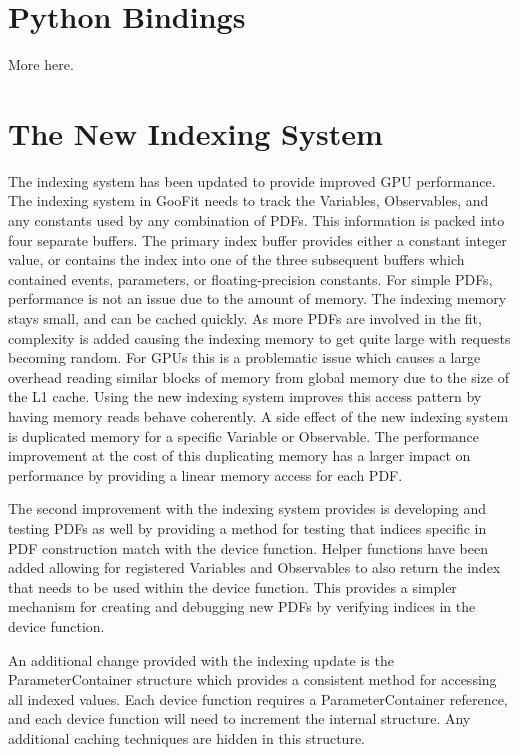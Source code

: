 \documentclass{webofc}
\begin{document}
\section{Python Bindings}
\label{sec-py}
More here.

\section{The New Indexing System}
\label{sec-ind}
The indexing system has been updated to provide improved GPU performance. The indexing system in GooFit needs to track the Variables, Observables, and any constants used by any combination of PDFs. This information is packed into four separate buffers. The primary index buffer provides either a constant integer value, or contains the index into one of the three subsequent buffers which contained events, parameters, or floating-precision constants\cite{GooFit}. For simple PDFs, performance is not an issue due to the amount of memory. The indexing memory stays small, and can be cached quickly. As more PDFs are involved in the fit, complexity is added causing the indexing memory to get quite large with requests becoming random. For GPUs this is a problematic issue which causes a large overhead reading similar blocks of memory from global memory due to the size of the L1 cache. Using the new indexing system improves this access pattern by having memory reads behave coherently. A side effect of the new indexing system is duplicated memory for a specific Variable or Observable. The performance improvement at the cost of this duplicating memory has a larger impact on performance by providing a linear memory access for each PDF.

The second improvement with the indexing system provides is developing and testing PDFs as well by providing a method for testing that indices specific in PDF construction match with the device function. Helper functions have been added allowing for registered Variables and Observables to also return the index that needs to be used within the device function. This provides a simpler mechanism for creating and debugging new PDFs by verifying indices in the device function. 

An additional change provided with the indexing update is the ParameterContainer structure which provides a consistent method for accessing all indexed values. Each device function requires a ParameterContainer reference, and each device function will need to increment the internal structure. Any additional caching techniques are hidden in this structure.
\end{document}
